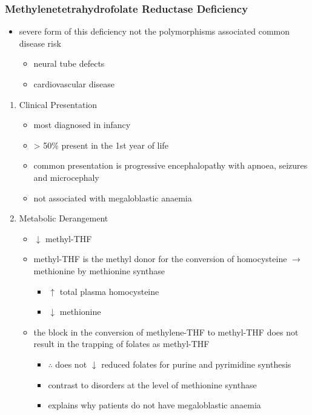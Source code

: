 \documentclass{scrartcl}
\begin{document}
\subsubsection{Methylenetetrahydrofolate Reductase Deficiency}
\label{sec:org80fe39a}
\begin{itemize}
\item severe form of this deficiency not the polymorphisms associated
common disease risk
\begin{itemize}
\item neural tube defects
\item cardiovascular disease
\end{itemize}
\end{itemize}
\begin{enumerate}
\item Clinical Presentation
\label{sec:org915701d}
\begin{itemize}
\item most diagnosed in infancy
\item \textgreater{} 50\% present in the 1st year of life
\item common presentation is progressive encephalopathy with apnoea,
seizures and microcephaly
\item not associated with megaloblastic anaemia
\end{itemize}

\item Metabolic Derangement
\label{sec:orgf30c03a}
\begin{itemize}
\item \(\downarrow\) methyl-THF
\item methyl-THF is the methyl donor for the conversion of homocysteine
\(\to\) methionine by methionine synthase
\begin{itemize}
\item \(\uparrow\) total plasma homocysteine
\item \(\downarrow\) methionine
\end{itemize}
\item the block in the conversion of methylene-THF to methyl-THF does not
result in the trapping of folates as methyl-THF
\begin{itemize}
\item \(\therefore\) does not \(\downarrow\) reduced folates for purine and
pyrimidine synthesis
\item contrast to disorders at the level of methionine synthase
\item explains why patients do not have megaloblastic anaemia
\end{itemize}
\end{itemize}


\end{enumerate}
\end{document}
